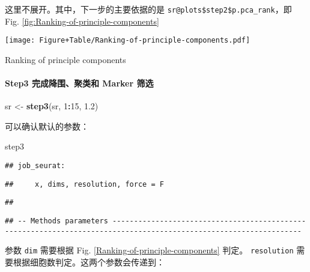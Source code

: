 \documentclass[
]{article}
\newenvironment{Shaded}{\begin{snugshade}}{\end{snugshade}}
\newcommand{\DecValTok}[1]{\textcolor[rgb]{0.00,0.00,0.81}{#1}}
\newcommand{\FloatTok}[1]{\textcolor[rgb]{0.00,0.00,0.81}{#1}}
\newcommand{\KeywordTok}[1]{\textcolor[rgb]{0.13,0.29,0.53}{\textbf{#1}}}
\newcommand{\NormalTok}[1]{#1}
\newcommand{\OperatorTok}[1]{\textcolor[rgb]{0.81,0.36,0.00}{\textbf{#1}}}
\newcommand{\StringTok}[1]{\textcolor[rgb]{0.31,0.60,0.02}{#1}}
\begin{document}
这里不展开。其中，下一步的主要依据的是 \texttt{sr@plots\$step2\$p.pca\_rank}，即 Fig. \ref{fig:Ranking-of-principle-components}

\def\@captype{figure}
\begin{center}
\texttt{[image: Figure+Table/Ranking-of-principle-components.pdf]}
\caption{Ranking of principle components}\label{fig:Ranking-of-principle-components}
\end{center}

\hypertarget{step3-ux5b8cux6210ux964dux56f4ux805aux7c7bux548c-marker-ux7b5bux9009}{%
\paragraph{Step3 完成降围、聚类和 Marker 筛选}\label{step3-ux5b8cux6210ux964dux56f4ux805aux7c7bux548c-marker-ux7b5bux9009}}

\begin{Shaded}
\begin{Highlighting}[]
\NormalTok{sr \textless{}{-}}\StringTok{ }\KeywordTok{step3}\NormalTok{(sr, }\DecValTok{1}\OperatorTok{:}\DecValTok{15}\NormalTok{, }\FloatTok{1.2}\NormalTok{)}
\end{Highlighting}
\end{Shaded}

可以确认默认的参数：

\begin{Shaded}
\begin{Highlighting}[]
\NormalTok{step3}
\end{Highlighting}
\end{Shaded}

\begin{verbatim}
## job_seurat:
\end{verbatim}

\begin{verbatim}
##     x, dims, resolution, force = F
\end{verbatim}

\begin{verbatim}
## 
\end{verbatim}

\begin{verbatim}
## -- Methods parameters ------------------------------------------------------------------------------------------------------------------
\end{verbatim}

参数 \texttt{dim} 需要根据 Fig. \ref{Ranking-of-principle-components} 判定。
\texttt{resolution} 需要根据细胞数判定。这两个参数会传递到：
\end{document}
